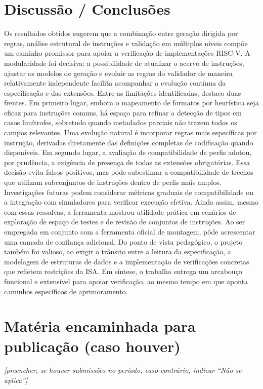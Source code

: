 \documentclass[12pt,a4paper]{article}
\begin{document}
\section{Discussão / Conclusões}
Os resultados obtidos sugerem que a combinação entre geração dirigida por regras, análise estrutural de instruções e validação em múltiplos níveis compõe um caminho promissor para apoiar a verificação de implementações RISC-V. A modularidade foi decisiva: a possibilidade de atualizar o acervo de instruções, ajustar os modelos de geração e evoluir as regras do validador de maneira relativamente independente facilita acompanhar a evolução contínua da especificação e das extensões.
\newline
\noindent Entre as limitações identificadas, destaco duas frentes. Em primeiro lugar, embora o mapeamento de formatos por heurística seja eficaz para instruções comuns, há espaço para refinar a detecção de tipos em casos limítrofes, sobretudo quando metadados parciais não trazem todos os campos relevantes. Uma evolução natural é incorporar regras mais específicas por instrução, derivadas diretamente das definições completas de codificação quando disponíveis. Em segundo lugar, a avaliação de compatibilidade de perfis adotou, por prudência, a exigência de presença de todas as extensões obrigatórias. Essa decisão evita falsos positivos, mas pode subestimar a compatibilidade de trechos que utilizam subconjuntos de instruções dentro de perfis mais amplos. Investigações futuras podem considerar métricas graduais de compatibilidade ou a integração com simuladores para verificar execução efetiva.
\newline
\noindent Ainda assim, mesmo com essas ressalvas, a ferramenta mostrou utilidade prática em cenários de exploração de espaço de testes e de revisão de conjuntos de instruções. Ao ser empregada em conjunto com a ferramenta oficial de montagem, pôde acrescentar uma camada de confiança adicional. Do ponto de vista pedagógico, o projeto também foi valioso, ao exigir o trânsito entre a leitura da especificação, a modelagem de estruturas de dados e a implementação de verificações concretas que refletem restrições da ISA. Em síntese, o trabalho entrega um arcabouço funcional e extensível para apoiar verificação, ao mesmo tempo em que aponta caminhos específicos de aprimoramento.

\section{Matéria encaminhada para publicação (caso houver)}
\textit{[preencher, se houver submissões no período; caso contrário, indicar ``Não se aplica'']}
\end{document}

